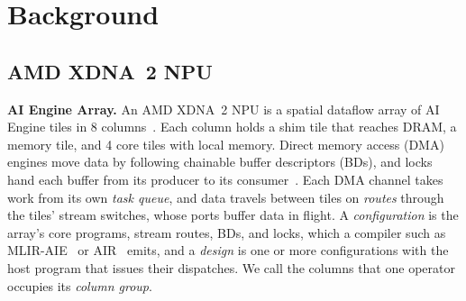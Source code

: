 \section{Background}
\label{sec:background}

\subsection{AMD XDNA~2 NPU}
\label{subsec:platform}

\textbf{AI Engine Array.}
An AMD XDNA~2 NPU is a spatial dataflow array of AI Engine tiles in 8 columns~\citep{linux-amdnpu}.
Each column holds a shim tile that reaches DRAM, a memory tile, and 4 core tiles with local memory.
Direct memory access (DMA) engines move data by following chainable buffer descriptors (BDs), and locks hand each buffer from its producer to its consumer~\citep{amd_am027}.
Each DMA channel takes work from its own \emph{task queue}, and data travels between tiles on \emph{routes} through the tiles' stream switches, whose ports buffer data in flight.
A \emph{configuration} is the array's core programs, stream routes, BDs, and locks, which a compiler such as MLIR-AIE~\citep{mlir-aie-repo} or AIR~\citep{wang2026mlirair} emits, and a \emph{design} is one or more configurations with the host program that issues their dispatches.
We call the columns that one operator occupies its \emph{column group}.

